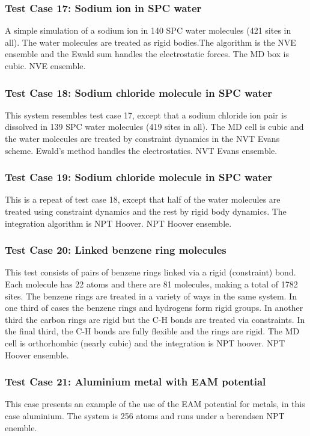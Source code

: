 \subsubsection{Test Case 17: Sodium ion in SPC water}
A simple simulation of a sodium ion in 140 SPC water molecules (421
sites in all). The water molecules are treated as rigid bodies.The
algorithm is the NVE ensemble and the Ewald sum handles the
electrostatic forces.  The MD box is cubic. NVE ensemble.

\subsubsection{Test Case 18: Sodium chloride molecule in SPC water}
This system resembles test case 17, except that a sodium chloride ion
pair is dissolved in 139 SPC water molecules (419 sites in all). The
MD cell is cubic and the water molecules are treated by constraint
dynamics in the NVT Evans scheme. Ewald's method handles the
electrostatics. NVT Evans ensemble.

\subsubsection{Test Case 19: Sodium chloride molecule in SPC water}
This is a repeat of test case 18, except that half of the water
molecules are treated using constraint dynamics and the rest by rigid
body dynamics. The integration algorithm is NPT Hoover. NPT Hoover
ensemble. 

\subsubsection{Test Case 20:  Linked benzene ring molecules}
This test consists of pairs of benzene rings linked via a rigid
(constraint) bond. Each molecule has 22 atoms and there are 81
molecules, making a total of 1782 sites. The benzene rings are treated
in a variety of ways in the same system. In one third of cases the
benzene rings and hydrogens form rigid groups. In another third the
carbon rings are rigid but the C-H bonds are treated via
constraints. In the final third, the C-H bonds are fully flexible and
the rings are rigid. The MD cell is orthorhombic (nearly cubic) and
the integration is NPT hoover. NPT Hoover ensemble.

\subsubsection{Test Case 21: Aluminium metal with EAM potential}
This case presents an example of the use of the EAM potential for
metals, in this case aluminium. The system is 256 atoms and runs under
a berendsen NPT enemble.

